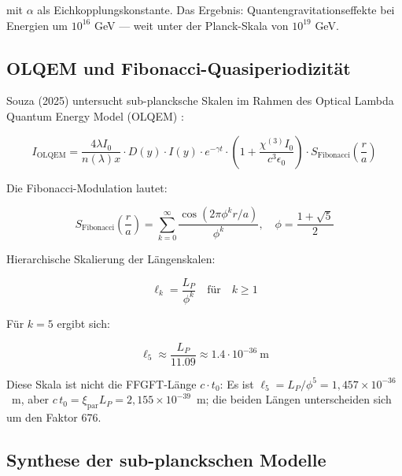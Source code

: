 	mit $\alpha$ als Eichkopplungskonstante. Das Ergebnis: Quantengravitationseffekte bei Energien um $10^{16}$ GeV — weit unter der Planck-Skala von $10^{19}$ GeV.
	
	\subsection{OLQEM und Fibonacci-Quasiperiodizität}
	
	Souza (2025) untersucht sub-plancksche Skalen im Rahmen des Optical Lambda Quantum Energy Model (OLQEM) \cite{subPlanck2025}:
	
	\begin{equation}
		I_{\text{OLQEM}} = \frac{4\lambda I_0}{n(\lambda)x} \cdot D(y) \cdot I(y) \cdot e^{-\gamma t} \cdot \left(1+\frac{\chi^{(3)}I_0}{c^3\epsilon_0}\right) \cdot S_{\text{Fibonacci}}\left(\frac{r}{a}\right)
	\end{equation}
	
	Die Fibonacci-Modulation lautet:
	
	\begin{equation}
		S_{\text{Fibonacci}}\left(\frac{r}{a}\right) = \sum_{k=0}^{\infty} \frac{\cos(2\pi \phi^k r/a)}{\phi^k}, \quad \phi = \frac{1+\sqrt{5}}{2}
	\end{equation}
	
	Hierarchische Skalierung der Längenskalen:
	
	\begin{equation}
		\ell_k = \frac{L_P}{\phi^{k}} \quad \text{für} \quad k \ge 1
	\end{equation}
	
	Für $k=5$ ergibt sich:
	
	\begin{equation}
		\ell_5 \approx \frac{L_P}{11.09} \approx 1.4 \cdot 10^{-36}~\text{m}
	\end{equation}
	
	Diese Skala ist nicht die FFGFT-Länge $c \cdot t_0$: Es ist $\ell_5 = L_P/\phi^5 = 1{,}457\times 10^{-36}$~m, aber $c\,t_0 = \xi_{\text{par}} L_P = 2{,}155\times 10^{-39}$~m; die beiden Längen unterscheiden sich um den Faktor 676.
	
	\subsection{Synthese der sub-planckschen Modelle}
	
